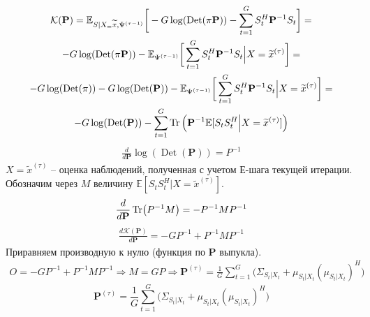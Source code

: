\documentclass[11pt]{article}
\newcommand{\Expect}{\mathbb{E}}
\DeclareMathOperator{\Det}{Det}
\begin{document}
\begin{equation*}
\begin{gathered}
\mathcal{K}(\mathbf{P}) = \Expect_{S|X_=\widetilde{x}, \Psi^{(\tau-1)}}\bigg[- G \log(\Det(\pi \mathbf{P})) - \sum_{t=1}^G S_t^H \mathbf{P}^{-1}S_t\bigg] = \\
- G \log(\Det(\pi \mathbf{P})) - \Expect_{\Psi^{(\tau-1)}}\bigg[ \sum_{t=1}^G S_t^H \mathbf{P}^{-1}S_t \Big | X = \widetilde{x}^{(\tau)} \bigg ] = \\
- G \log(\Det(\pi)) - G \log(\Det(\mathbf{P})) - \Expect_{\Psi^{(\tau-1)}}\bigg[ \sum_{t=1}^G S_t^H \mathbf{P}^{-1}S_t \Big | X = \widetilde{x}^{(\tau)} \bigg ] = \\
 - G \log(\Det(\mathbf{P})) - \sum_{t=1}^G \Tr\Big(\mathbf{P}^{-1} \Expect[S_t S_t^H\Big| X = \widetilde{x}^{(\tau)}]\Big)
\end{gathered}
\end{equation*}
\begin{equation*}
\begin{gathered}
\frac{d}{d\mathbf{P}}\log (\Det (\mathbf{P})) = P^{-1}
\end{gathered}
\end{equation*}
$X = \widetilde{x}^{(\tau)}$ -- оценка наблюдений, полученная с учетом Е-шага текущей итерации.
Обозначим через $M$ величину $\Expect[S_t S_t^H\Big| X = \widetilde{x}^{(\tau)}]$.
\begin{equation*}
\begin{gathered}
\frac{d}{d\mathbf{P}}\Tr(P^{-1}M)= -P^{-1}MP^{-1}
\end{gathered}
\end{equation*}
\begin{equation*}
\begin{gathered}
\frac{d\mathcal{K}(\mathbf{P})}{d\mathbf{P}} = -GP^{-1}+P^{-1}MP^{-1}
\end{gathered}
\end{equation*}
Приравняем производную к нулю (функция по $\mathbf{P}$ выпукла).
\begin{equation*}
\begin{gathered}
O = -GP^{-1}+P^{-1}MP^{-1} \Rightarrow M =GP \Rightarrow \mathbf{P}^{(\tau)} = \frac{1}{G} \sum_{t=1}^G \Big( \Sigma_{S_t|X_t} +  \mu_{S_t|X_t}  (\mu_{S_t|X_t})^H \Big)
\end{gathered}
\end{equation*}
\begin{equation}
\mathbf{P}^{(\tau)} = \frac{1}{G} \sum_{t=1}^G \Big( \Sigma_{S_t|X_t} +  \mu_{S_t|X_t}  (\mu_{S_t|X_t})^H \Big)
\end{equation}
\end{document}
